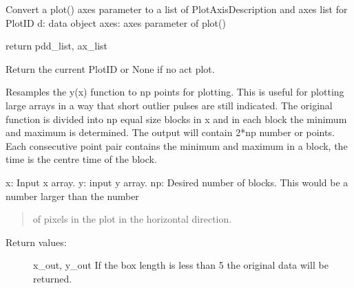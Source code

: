 \documentclass[letterpaper,10pt,english]{sphinxmanual}
\begin{document}

\begin{fulllineitems}
\label{\detokenize{plot:flap.plot.axes_to_pdd_list}}
Convert a plot() axes parameter to a list of PlotAxisDescription and axes list for PlotID
d: data object
axes: axes parameter of plot()

return pdd\_list, ax\_list

\end{fulllineitems}


\begin{fulllineitems}
\label{\detokenize{plot:flap.plot.get_plot_id}}
Return the current PlotID or None if no act plot.

\end{fulllineitems}


\begin{fulllineitems}
\label{\detokenize{plot:flap.plot.sample_for_plot}}
Resamples the y(x) function to np points for plotting.
This is useful for plotting large arrays in a way that short outlier pulses
are still indicated.
The original function is divided into np equal size blocks in x and in each block
the minimum and maximum is determined. The output will contain 2*np number
or points. Each consecutive point pair contains the minimum and maximum in
a block, the time is the centre time of the block.

x: Input x array.
y: input y array.
np: Desired number of blocks. This would be a number larger than the number
\begin{quote}

of pixels in the plot in the horizontal direction.
\end{quote}
\begin{description}
\item[{Return values:}] \leavevmode
x\_out, y\_out
If the box length is less than 5 the original data will be returned.

\end{description}

\end{fulllineitems}
\end{document}
